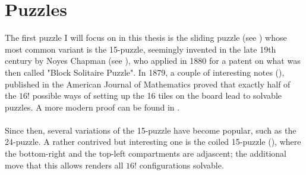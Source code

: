 
\chapter{Puzzles} %

\label{sec:Puzzles} %





The first puzzle I will focus on in this thesis is the sliding puzzle (see \cite{SlidingPuzzleWiki}) whose most common variant is the 15-puzzle, seemingly invented in the late 19th century by Noyes Chapman (see \cite{SlidingPuzzleWolfram}), who applied in 1880 for a patent on what was then called "Block Solitaire Puzzle". In 1879, a couple of interesting notes (\cite{Johnson1879}), published in the American Journal of Mathematics proved that exactly half of the $16!$ possible ways of setting up the 16 tiles on the board lead to solvable puzzles. A more modern proof can be found in \cite{Archer1999}.
\\
\\
Since then, several variations of the 15-puzzle have become popular, such as the 24-puzzle. A rather contrived but interesting one is the coiled 15-puzzle (\cite{Coiled15Puzzle}), where the bottom-right and the top-left compartments are adjascent; the additional move that this allows renders all $16!$ configurations solvable. 



